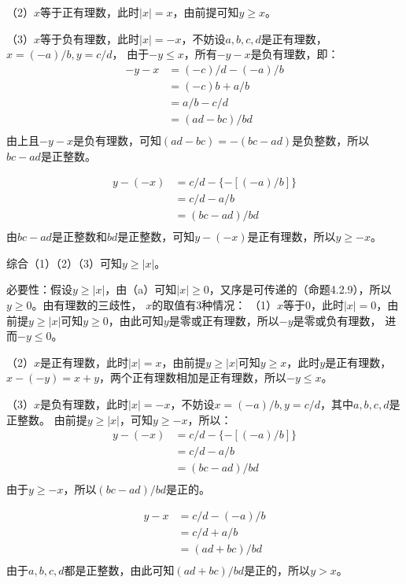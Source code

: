 \documentclass{article}
\theoremstyle{mystyle}
\begin{document}
（2）$x$等于正有理数，此时$|x|=x$，由前提可知$y \geq x$。

（3）$x$等于负有理数，此时$|x|=-x$，不妨设$a,b,c,d$是正有理数，$x=(-a)/b,y=c/d$，
由于$-y \leq x$，所有$-y-x$是负有理数，即：
\begin{align*}
  -y - x & = (-c)/d - (-a)/b \\
         & = (-c)b + a/b     \\
         & = a/b - c/d       \\
         & = (ad - bc) / bd  \\
\end{align*}
由上且$-y-x$是负有理数，可知$(ad-bc)=-(bc-ad)$是负整数，所以$bc-ad$是正整数。

\begin{align*}
  y - (-x) & = c/d - \{-[(-a)/b]\} \\
           & = c/d - a/b           \\
           & = (bc - ad) / bd      \\
\end{align*}
由$bc-ad$是正整数和$bd$是正整数，可知$y-(-x)$是正有理数，所以$y \geq -x$。

综合（1）（2）（3）可知$y \geq |x|$。

必要性：假设$y \geq |x|$，由（a）可知$|x| \geq 0$，又序是可传递的（命题4.2.9），所以$y \geq 0$。由有理数的三歧性，
$x$的取值有3种情况：
（1）$x$等于0，此时$|x|=0$，由前提$y \geq |x|$可知$y \geq 0$，由此可知$y$是零或正有理数，所以$-y$是零或负有理数，
进而$-y \leq 0$。

（2）$x$是正有理数，此时$|x|=x$，由前提$y \geq |x|$可知$y \geq x$，此时$y$是正有理数，$x-(-y)=x+y$，两个正有理数相加是正有理数，所以$-y \leq x$。

（3）$x$是负有理数，此时$|x|=-x$，不妨设$x=(-a)/b,y=c/d$，其中$a,b,c,d$是正整数。
由前提$y \geq |x|$，可知$y \geq -x$，所以：
\begin{align*}
  y - (-x) & = c/d - \{-[(-a)/b]\} \\
           & = c/d - a/b           \\
           & = (bc - ad)/bd        \\
\end{align*}
由于$y \geq -x$，所以$(bc - ad)/bd$是正的。

\begin{align*}
  y - x & = c/d - (-a)/b   \\
        & = c/d + a/b      \\
        & = (ad + bc) / bd \\
\end{align*}
由于$a,b,c,d$都是正整数，由此可知$(ad + bc) / bd$是正的，所以$y > x$。
\end{document}
